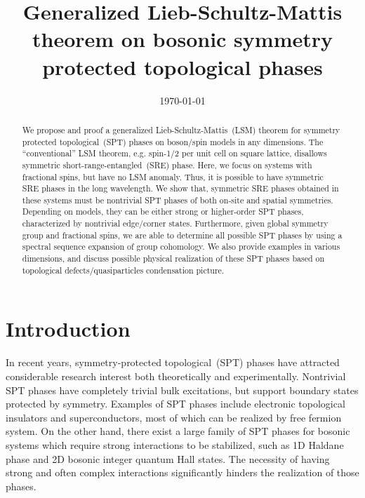 \documentclass[reprint,amsmath,amssymb,aps,pra,]{revtex4-1}
\begin{document}
\title{Generalized Lieb-Schultz-Mattis theorem on bosonic symmetry protected topological phases}%

\date{\today}

\begin{abstract}
  We propose and proof a generalized Lieb-Schultz-Mattis~(LSM) theorem for symmetry protected topological~(SPT) phases on boson/spin models in any dimensions.
  The ``conventional'' LSM theorem, e.g. spin-1/2 per unit cell on square lattice, disallows symmetric short-range-entangled~(SRE) phase. 
  Here, we focus on systems with fractional spins, but have no LSM anomaly. 
  Thus, it is possible to have symmetric SRE phases in the long wavelength.
  We show that, symmetric SRE phases obtained in these systems must be nontrivial SPT phases of both on-site and spatial symmetries.
  Depending on models, they can be either strong or higher-order SPT phases, characterized by nontrivial edge/corner states.
  Furthermore, given global symmetry group and fractional spins, we are able to determine all possible SPT phases by using a spectral sequence expansion of group cohomology.
  We also provide examples in various dimensions, and discuss possible physical realization of these SPT phases based on topological defects/quasiparticles condensation picture.
\end{abstract}

\maketitle

\tableofcontents


\section{Introduction}\label{sec:intro}
In recent years, symmetry-protected topological~(SPT) phases have attracted considerable research interest both theoretically and experimentally.
Nontrivial SPT phases have completely trivial bulk excitations, but support boundary states protected by symmetry.
Examples of SPT phases include electronic topological insulators and superconductors, most of which can be realized by free fermion system. On the other hand, there exist a large family of SPT phases for bosonic systems which require strong interactions to be stabilized, such as 1D Haldane phase and 2D bosonic integer quantum Hall states. The necessity of having strong and often complex interactions significantly hinders the realization of those phases.
\end{document}
